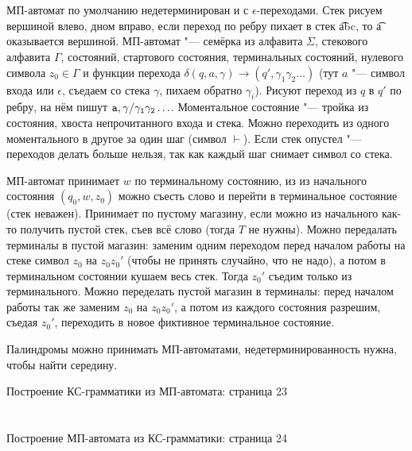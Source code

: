 \section{} %
	МП-автомат по умолчанию недетерминирован и с $\epsilon$-переходами.
	Стек рисуем вершиной влево, дном вправо, если переход по ребру пихает в стек \t{abc}, то \t{a} оказывается вершиной.
	МП-автомат "--- семёрка из алфавита $\Sigma$, стекового алфавита $\Gamma$, состояний, стартового состояния, терминальных состояний,
	нулевого символа $z_0 \in \Gamma$ и функции перехода $\delta(q, a, \gamma) \to (q', \gamma_1\gamma_2\dots)$ (тут $a$ "--- символ входа или $\epsilon$,
	съедаем со стека $\gamma$, пихаем обратно $\gamma_i$).
	Рисуют переход из $q$ в $q'$ по ребру, на нём пишут $\t{a, \gamma/\gamma_1\gamma_2\dots}$.
	Моментальное состояние "--- тройка из состояния, хвоста непрочитанного входа и стека.
	Можно переходить из одного моментального в другое за один шаг (символ $\vdash$).
	Если стек опустел "--- переходов делать больше нельзя, так как каждый шаг снимает символ со стека.

	МП-автомат принимает $w$ по терминальному состоянию, из из начального состояния $(q_0, w, z_0)$
	можно съесть слово и перейти в терминальное состояние (стек неважен).
	Принимает по пустому магазину, если можно из начального как-то получить пустой стек, съев всё слово (тогда $T$ не нужны).
	Можно передалать терминалы в пустой магазин: заменим одним переходом перед началом работы на стеке символ $z_0$ на $z_0z_0'$
	(чтобы не принять случайно, что не надо), а потом в терминальном состоянии кушаем весь стек.
	Тогда $z_0'$ съедим только из терминального.
	Можно переделать пустой магазин в терминалы: перед началом работы так же заменим $z_0$ на $z_0z_0'$, а потом из каждого
	состояния разрешим, съедая $z_0'$, переходить в новое фиктивное терминальное состояние.

	Палиндромы можно принимать МП-автоматами, недетерминированность нужна, чтобы найти середину.


	Построение КС-грамматики из МП-автомата: \TODO страница 23


\section{} %
	Построение МП-автомата из КС-грамматики: \TODO страница 24

